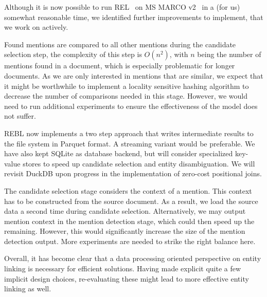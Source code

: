 Although it is now possible to run REL~\cite{REL} on MS MARCO v2~\cite{msmarco} in a (for us) somewhat reasonable time, we identified further improvements to implement, that we work on actively. 

Found mentions are compared to all other mentions during the candidate selection step, the complexity of this step is $O(n^2)$, with $n$ being the number of mentions found in a document, which is especially problematic for longer documents. As we are only interested in mentions that are similar, we expect that it might be worthwhile to implement a locality sensitive hashing algorithm to decrease the number of comparisons needed in this stage. However, we would need to run additional experiments to ensure the effectiveness of the model does not suffer. 

REBL now implements a two step approach that writes intermediate results to the file system in Parquet format. A streaming variant would be preferable. We have also kept SQLite as database backend, but will consider specialized key-value stores to speed up candidate selection and entity disambiguation. We will revisit DuckDB upon progress in the implementation of zero-cost positional joins.  

The candidate selection stage considers the context of a mention. This context has to be constructed from the source document. As a result, we load the source data a second time during candidate selection. Alternatively, we may output mention context in the mention detection stage, which could then speed up the remaining. However, this would significantly increase the size of the mention detection output. More experiments are needed to strike the right balance here.

Overall, it has become clear that a data processing oriented perspective on entity linking is necessary for efficient solutions. Having made explicit quite a few implicit design choices, re-evaluating these might lead to more effective entity linking as well. 